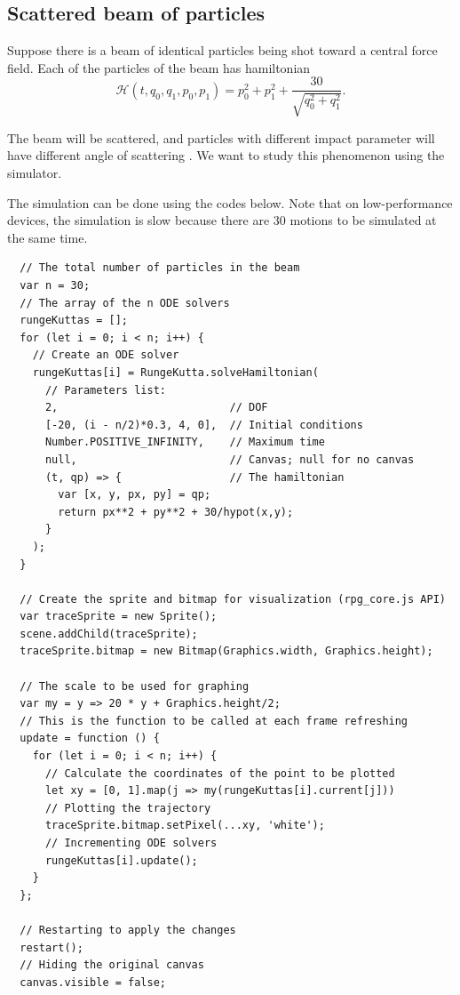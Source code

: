 \documentclass[12pt]{article}
\begin{document}
\subsection{Scattered beam of particles}

Suppose there is a beam of identical particles being shot toward a central force field.
Each of the particles of the beam has hamiltonian
\begin{equation*}
  \mathcal H\left(t,q_0,q_1,p_0,p_1\right)=p_0^2+p_1^2+\frac{30}{\sqrt{q_0^2+q_1^2}}.
\end{equation*}

The beam will be scattered, and particles with different impact parameter will
have different angle of scattering \cite[p. 49]{landau1976mechanics}.
We want to study this phenomenon using the simulator.

The simulation can be done using the codes below.
Note that on low-performance devices, the simulation is slow
because there are 30 motions to be simulated at the same time.

\begin{verbatim}
  // The total number of particles in the beam
  var n = 30;
  // The array of the n ODE solvers
  rungeKuttas = [];
  for (let i = 0; i < n; i++) {
    // Create an ODE solver
    rungeKuttas[i] = RungeKutta.solveHamiltonian(
      // Parameters list:
      2,                           // DOF
      [-20, (i - n/2)*0.3, 4, 0],  // Initial conditions
      Number.POSITIVE_INFINITY,    // Maximum time
      null,                        // Canvas; null for no canvas
      (t, qp) => {                 // The hamiltonian
        var [x, y, px, py] = qp;
        return px**2 + py**2 + 30/hypot(x,y);
      }
    );
  }

  // Create the sprite and bitmap for visualization (rpg_core.js API)
  var traceSprite = new Sprite();
  scene.addChild(traceSprite);
  traceSprite.bitmap = new Bitmap(Graphics.width, Graphics.height);

  // The scale to be used for graphing
  var my = y => 20 * y + Graphics.height/2;
  // This is the function to be called at each frame refreshing
  update = function () {
    for (let i = 0; i < n; i++) {
      // Calculate the coordinates of the point to be plotted
      let xy = [0, 1].map(j => my(rungeKuttas[i].current[j]))
      // Plotting the trajectory
      traceSprite.bitmap.setPixel(...xy, 'white');
      // Incrementing ODE solvers
      rungeKuttas[i].update();
    }
  };

  // Restarting to apply the changes
  restart();
  // Hiding the original canvas
  canvas.visible = false;
\end{verbatim}
\end{document}
